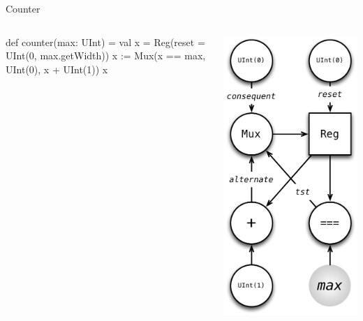 \documentclass[xcolor=pdflatex,dvipsnames,table]{beamer}
\begin{document}
\begin{frame}[fragile]{Counter}

\begin{columns}

\begin{scala}
def counter(max: UInt) = {
  val x = Reg(reset = UInt(0, max.getWidth))
  x := Mux(x == max, UInt(0), x + UInt(1))
  x
}
\end{scala}


\begin{center}
\includegraphics[height=0.9\textheight]{figs/counter.pdf} 
\end{center}

\end{columns}

\end{frame}
\end{document}
